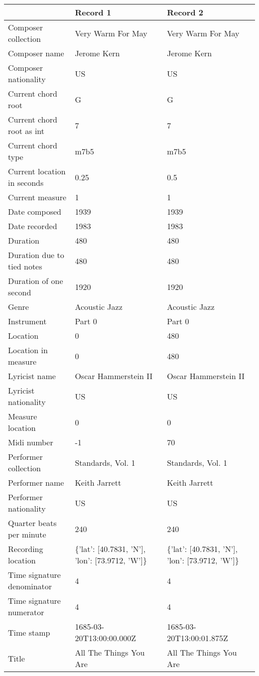 \documentclass[11pt]{article}
\begin{document}
    \begin{tabular}{lll}
\toprule
{} &                                        Record 1 &                                        Record 2 \\
\midrule
Composer collection         &  Very Warm For May &  Very Warm For May \\
Composer name               &  Jerome Kern &  Jerome Kern \\
Composer nationality        &  US &  US \\
Current chord root          &  G &  G \\
Current chord root as int   &  7 &  7 \\
Current chord type          &  m7b5 &  m7b5 \\
Current location in seconds &  0.25 &  0.5 \\
Current measure             &  1 &  1 \\
Date composed               &  1939 &  1939 \\
Date recorded               &  1983 &  1983 \\
Duration                    &  480 &  480 \\
Duration due to tied notes  &  480 &  480 \\
Duration of one second      &  1920 &  1920 \\
Genre                       &  Acoustic Jazz &  Acoustic Jazz \\
Instrument                  &  Part 0 &  Part 0 \\
Location                    &  0 &  480 \\
Location in measure         &  0 &  480 \\
Lyricist name               &  Oscar Hammerstein II &  Oscar Hammerstein II \\
Lyricist nationality        &  US &  US \\
Measure location            &  0 &  0 \\
Midi number                 &  -1 &  70 \\
Performer collection        &  Standards, Vol. 1 &  Standards, Vol. 1 \\
Performer name              &  Keith Jarrett &  Keith Jarrett \\
Performer nationality       &  US &  US \\
Quarter beats per minute    &  240 &  240 \\
Recording location          &  \{'lat': [40.7831, 'N'], 'lon': [73.9712, 'W']\} &  \{'lat': [40.7831, 'N'], 'lon': [73.9712, 'W']\} \\
Time signature denominator  &  4 &  4 \\
Time signature numerator    &  4 &  4 \\
Time stamp                  &  1685-03-20T13:00:00.000Z &  1685-03-20T13:00:01.875Z \\
Title                       &  All The Things You Are &  All The Things You Are \\
\bottomrule
\end{tabular}
\end{document}
